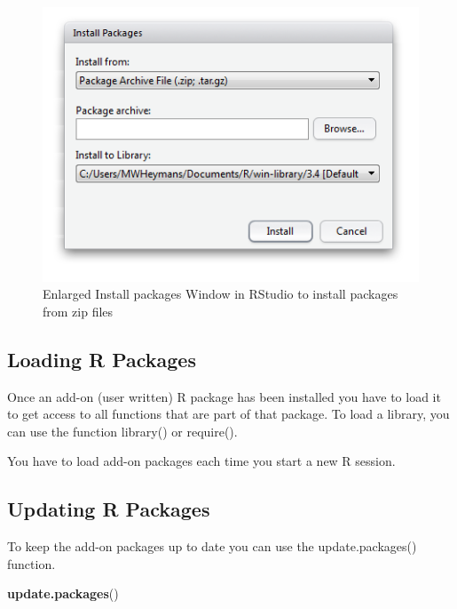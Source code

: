 \documentclass[]{book}
\newenvironment{Shaded}{\begin{snugshade}}{\end{snugshade}}
\newcommand{\KeywordTok}[1]{\textcolor[rgb]{0.13,0.29,0.53}{\textbf{#1}}}
\newcommand{\NormalTok}[1]{#1}
\begin{document}
\begin{figure}

{\centering \includegraphics[width=0.95\linewidth]{images/fig1.26b} 

}

\caption{Enlarged Install packages Window in RStudio to install packages from zip files}\label{fig:fig28}
\end{figure}

\subsection{Loading R Packages}\label{loading-r-packages}

Once an add-on (user written) R package has been installed you have to
load it to get access to all functions that are part of that package. To
load a library, you can use the function library() or require().

You have to load add-on packages each time you start a new R session.

\subsection{Updating R Packages}\label{updating-r-packages}

To keep the add-on packages up to date you can use the update.packages()
function.

\begin{Shaded}
\begin{Highlighting}[]
\KeywordTok{update.packages}\NormalTok{()}
\end{Highlighting}
\end{Shaded}
\end{document}
